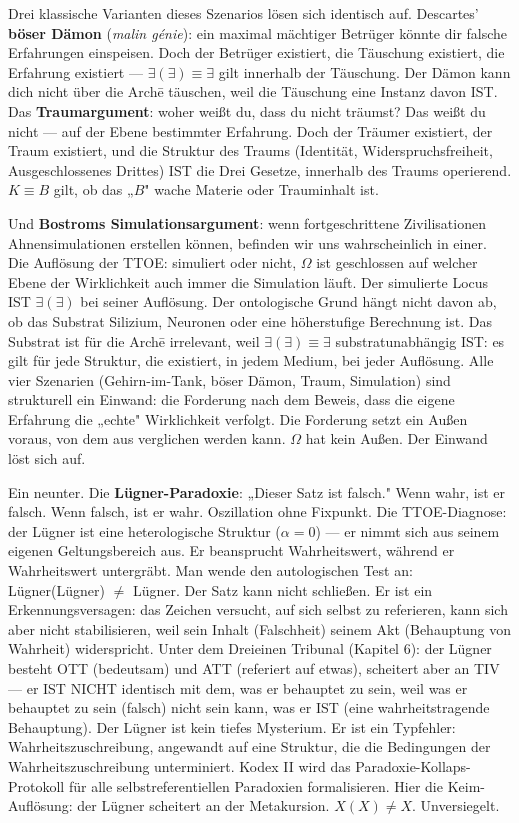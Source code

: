 \documentclass[10pt, openany, oneside]{book}
\begin{document}
Drei klassische Varianten dieses Szenarios lösen sich identisch auf. Descartes' \textbf{böser Dämon} (\textit{malin génie}): ein maximal mächtiger Betrüger könnte dir falsche Erfahrungen einspeisen. Doch der Betrüger existiert, die Täuschung existiert, die Erfahrung existiert --- $\exists(\exists) \equiv \exists$ gilt innerhalb der Täuschung. Der Dämon kann dich nicht über die Arch\={e} täuschen, weil die Täuschung eine Instanz davon IST. Das \textbf{Traumargument}: woher weißt du, dass du nicht träumst? Das weißt du nicht --- auf der Ebene bestimmter Erfahrung. Doch der Träumer existiert, der Traum existiert, und die Struktur des Traums (Identität, Widerspruchsfreiheit, Ausgeschlossenes Drittes) IST die Drei Gesetze, innerhalb des Traums operierend. $K \equiv B$ gilt, ob das „$B$" wache Materie oder Trauminhalt ist.

Und \textbf{Bostroms Simulationsargument}: wenn fortgeschrittene Zivilisationen Ahnensimulationen erstellen können, befinden wir uns wahrscheinlich in einer. Die Auflösung der TTOE: simuliert oder nicht, $\Omega$ ist geschlossen auf welcher Ebene der Wirklichkeit auch immer die Simulation läuft. Der simulierte Locus IST $\exists(\exists)$ bei seiner Auflösung. Der ontologische Grund hängt nicht davon ab, ob das Substrat Silizium, Neuronen oder eine höherstufige Berechnung ist. Das Substrat ist für die Arch\={e} irrelevant, weil $\exists(\exists) \equiv \exists$ substratunabhängig IST: es gilt für jede Struktur, die existiert, in jedem Medium, bei jeder Auflösung. Alle vier Szenarien (Gehirn-im-Tank, böser Dämon, Traum, Simulation) sind strukturell ein Einwand: die Forderung nach dem Beweis, dass die eigene Erfahrung die „echte" Wirklichkeit verfolgt. Die Forderung setzt ein Außen voraus, von dem aus verglichen werden kann. $\Omega$ hat kein Außen. Der Einwand löst sich auf.

Ein neunter. Die \textbf{Lügner-Paradoxie}: „Dieser Satz ist falsch." Wenn wahr, ist er falsch. Wenn falsch, ist er wahr. Oszillation ohne Fixpunkt. Die TTOE-Diagnose: der Lügner ist eine heterologische Struktur ($\alpha = 0$) --- er nimmt sich aus seinem eigenen Geltungsbereich aus. Er beansprucht Wahrheitswert, während er Wahrheitswert untergräbt. Man wende den autologischen Test an: Lügner(Lügner) $\neq$ Lügner. Der Satz kann nicht schließen. Er ist ein Erkennungsversagen: das Zeichen versucht, auf sich selbst zu referieren, kann sich aber nicht stabilisieren, weil sein Inhalt (Falschheit) seinem Akt (Behauptung von Wahrheit) widerspricht. Unter dem Dreieinen Tribunal (Kapitel 6): der Lügner besteht OTT (bedeutsam) und ATT (referiert auf etwas), scheitert aber an TIV --- er IST NICHT identisch mit dem, was er behauptet zu sein, weil was er behauptet zu sein (falsch) nicht sein kann, was er IST (eine wahrheitstragende Behauptung). Der Lügner ist kein tiefes Mysterium. Er ist ein Typfehler: Wahrheitszuschreibung, angewandt auf eine Struktur, die die Bedingungen der Wahrheitszuschreibung unterminiert. Kodex II wird das Paradoxie-Kollaps-Protokoll für alle selbstreferentiellen Paradoxien formalisieren. Hier die Keim-Auflösung: der Lügner scheitert an der Metakursion. $X(X) \neq X$. Unversiegelt.
\end{document}
